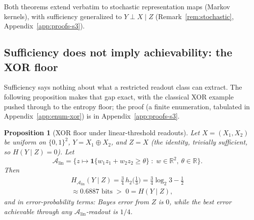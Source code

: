 \documentclass[twocolumn,10pt]{article}
\newtheorem{proposition}[theorem]{Proposition}
\theoremstyle{definition}
\theoremstyle{remark}
\newcommand{\R}{\mathbb{R}}
\newcommand{\cA}{\mathcal{A}}
\newcommand{\Alin}{\cA_{\mathrm{lin}}}
\newcommand{\hb}{h_2}
\begin{document}
Both theorems extend verbatim to stochastic representation maps
(Markov kernels), with sufficiency generalized to $Y \perp X \mid Z$
(Remark~\ref{rem:stochastic}, Appendix~\ref{app:proofs-s3}).

\subsection{Sufficiency does not imply achievability: the XOR floor}
\label{sec:xor-floor}

Sufficiency says nothing about what a restricted readout class can extract.
The following proposition makes that gap exact, with the classical XOR
example \cite{minskypapert} pushed through to the entropy floor; the
proof (a finite enumeration, tabulated in Appendix~\ref{app:enum-xor})
is in Appendix~\ref{app:proofs-s3}.

\begin{proposition}[XOR floor under linear-threshold readouts]
\label{prop:xor-floor}
Let $X = (X_1, X_2)$ be uniform on $\{0,1\}^2$, $Y = X_1 \oplus X_2$, and
$Z = X$ (the identity, trivially sufficient, so $H(Y \mid Z) = 0$). Let
\[
\Alin
= \big\{z \mapsto \mathbf 1\{w_1 z_1 + w_2 z_2 \ge \theta\}
  \;:\; w \in \R^2,\ \theta \in \R\big\}.
\]
Then
\begin{multline*}
H_{\Alin}(Y \mid Z)
= \tfrac34\, \hb\!\big(\tfrac13\big)
= \tfrac34 \log_2 3 - \tfrac12 \\
\approx 0.6887 \text{ bits}
\;>\; 0 = H(Y \mid Z),
\end{multline*}
and in error-probability terms: Bayes error from $Z$ is $0$, while the best
error achievable through any $\Alin$-readout is $1/4$.
\end{proposition}
\end{document}
